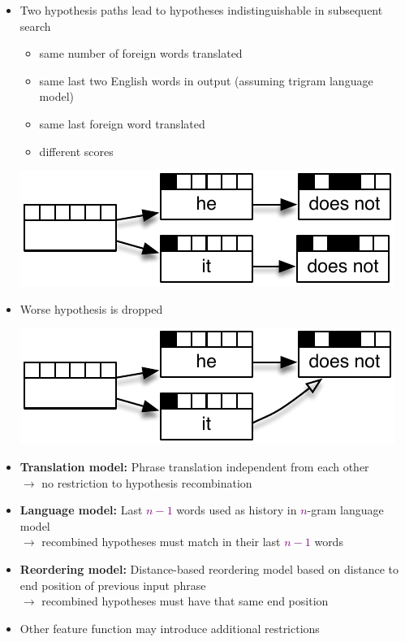 \documentclass[landscape]{slides}
\newcommand{\maths}[1]{\textcolor{purple}{#1}}
\begin{document}
\begin{itemize}
\item Two hypothesis paths lead to hypotheses indistinguishable in subsequent search
\begin{itemize}
\item same number of foreign words translated
\item same last two English words in output (assuming trigram language model)
\item same last foreign word translated
\item different scores
\end{itemize}\vspace{-10mm}
\begin{center}
\includegraphics[scale=1.3]{recombination-example3b.pdf}
\end{center}\vspace{-12mm}
\item  Worse hypothesis is dropped
\begin{center}\vspace{-7mm}
\includegraphics[scale=1.3]{recombination-example4b.pdf}
\end{center}
\end{itemize}


\begin{itemize}\vspace{10mm}
\item {\bf Translation model:} Phrase translation independent from each other\\[3mm]
$\rightarrow$ no restriction to hypothesis recombination
\item {\bf Language model:} Last \maths{$n-1$} words used as history in \maths{$n$}-gram language model\\[3mm]
$\rightarrow$ recombined hypotheses must match in their last \maths{$n-1$} words
\item {\bf Reordering model:} Distance-based reordering model based on distance to end position of previous input phrase\\[3mm]
$\rightarrow$ recombined hypotheses must have that same end position
\item Other feature function may introduce additional restrictions
\end{itemize}
\end{document}
